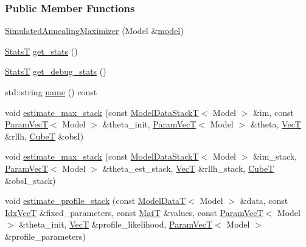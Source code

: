 \subsubsection*{Public Member Functions}
\begin{DoxyCompactItemize}
\item 
\hyperlink{classmappel_1_1SimulatedAnnealingMaximizer_a76e0c1b5ca19fc31d10dded7b992e0cb}{Simulated\+Annealing\+Maximizer} (Model \&\hyperlink{classmappel_1_1Estimator_a8322546d87ccdf01f8b0dcd9dae509f0}{model})
\item 
\hyperlink{namespacemappel_a04ab395b0cf82c4ce68a36b2212649a5}{StatsT} \hyperlink{classmappel_1_1SimulatedAnnealingMaximizer_ab51d52418cec2fe9cfbf7382a8cfd486}{get\+\_\+stats} ()
\item 
\hyperlink{namespacemappel_a04ab395b0cf82c4ce68a36b2212649a5}{StatsT} \hyperlink{classmappel_1_1SimulatedAnnealingMaximizer_a72a7ee87c7294976b673dcb89b89a373}{get\+\_\+debug\+\_\+stats} ()
\item 
std\+::string \hyperlink{classmappel_1_1SimulatedAnnealingMaximizer_aac0fdc481666bf76ec4387c9c57c9e71}{name} () const 
\item 
void \hyperlink{classmappel_1_1ThreadedEstimator_afb7a2e27b4e8dcc2fa604f83344461fe}{estimate\+\_\+max\+\_\+stack} (const \hyperlink{namespacemappel_aaeb6665bc57476dd93c2df6ad8bc4768}{Model\+Data\+StackT}$<$ Model $>$ \&im, const \hyperlink{namespacemappel_a0f86d3153e4e27b095012f140eea58de}{Param\+VecT}$<$ Model $>$ \&theta\+\_\+init, \hyperlink{namespacemappel_a0f86d3153e4e27b095012f140eea58de}{Param\+VecT}$<$ Model $>$ \&theta, \hyperlink{namespacemappel_a2225ad69f358daa3f4f99282a35b9a3a}{VecT} \&rllh, \hyperlink{namespacemappel_ab2afab4e6c8805e83946670d882768c2}{CubeT} \&obsI)
\item 
void \hyperlink{classmappel_1_1Estimator_aa1b1c2677df2c6ea9fcf67b6a0856e46}{estimate\+\_\+max\+\_\+stack} (const \hyperlink{namespacemappel_aaeb6665bc57476dd93c2df6ad8bc4768}{Model\+Data\+StackT}$<$ Model $>$ \&im\+\_\+stack, \hyperlink{namespacemappel_a0f86d3153e4e27b095012f140eea58de}{Param\+VecT}$<$ Model $>$ \&theta\+\_\+est\+\_\+stack, \hyperlink{namespacemappel_a2225ad69f358daa3f4f99282a35b9a3a}{VecT} \&rllh\+\_\+stack, \hyperlink{namespacemappel_ab2afab4e6c8805e83946670d882768c2}{CubeT} \&obs\+I\+\_\+stack)
\item 
void \hyperlink{classmappel_1_1ThreadedEstimator_aebbf686f95be1331ff85cecd5a3c97db}{estimate\+\_\+profile\+\_\+stack} (const \hyperlink{namespacemappel_a97f050df953605381ae9c901c3b125f1}{Model\+DataT}$<$ Model $>$ \&data, const \hyperlink{namespacemappel_ac63743dcd42180127307cd0e4ecdd784}{Idx\+VecT} \&fixed\+\_\+parameters, const \hyperlink{namespacemappel_a7091ab87c528041f7e2027195fad8915}{MatT} \&values, const \hyperlink{namespacemappel_a0f86d3153e4e27b095012f140eea58de}{Param\+VecT}$<$ Model $>$ \&theta\+\_\+init, \hyperlink{namespacemappel_a2225ad69f358daa3f4f99282a35b9a3a}{VecT} \&profile\+\_\+likelihood, \hyperlink{namespacemappel_a0f86d3153e4e27b095012f140eea58de}{Param\+VecT}$<$ Model $>$ \&profile\+\_\+parameters)

\end{DoxyCompactItemize}
